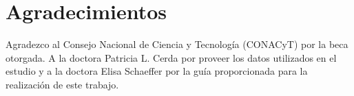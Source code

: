 \documentclass[final,5p,times]{elsarticle}
\begin{document}
\section*{Agradecimientos}

Agradezco al Consejo Nacional de Ciencia y Tecnolog\'ia (CONACyT) por la beca otorgada. A la doctora Patricia L. Cerda por proveer los datos utilizados en el estudio y a la doctora Elisa Schaeffer por la gu\'ia proporcionada para la realizaci\'on de este trabajo.


\end{document}
